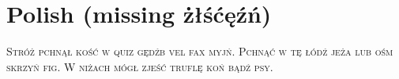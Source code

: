 
\presection\section*{\checkno Polish (missing żłśćęźń)}\postsection

\noindent\textsc{
Stróż pchnął kość w quiz gędźb vel fax myjń. 
Pchnąć w tę łódź jeża lub ośm skrzyń fig.
W niżach mógł zjeść truflę koń bądź psy.
}